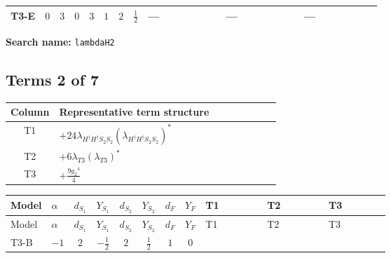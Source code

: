 \documentclass[8pt]{article}
\begin{document}
\begin{landscape}
\begin{longtable}{@{}llcccccc >{\raggedright\arraybackslash}p{0.21\linewidth} >{\raggedright\arraybackslash}p{0.21\linewidth} >{\raggedright\arraybackslash}p{0.21\linewidth}@{}}
\midrule
T3-E & $0$ & $3$ & $0$ & $3$ & $1$ & $2$ & $\frac{1}{2}$ & --- & --- & --- \\
\midrule
\bottomrule
\end{longtable}
\clearpage
\noindent\textbf{Search name: }\texttt{lambdaH2}\par\smallskip
\subsection*{Terms 2 of 7}
\begin{center}
\begin{tabular}{@{}c >{\raggedright\arraybackslash}p{0.82\linewidth}@{}}
\toprule
Column & Representative term structure \\
\midrule
T1 & \(\displaystyle +24 {\lambda_{H^\dagger H^\dagger S_2 S_2}} \left({\lambda_{H^\dagger H^\dagger S_2 S_2}}\right)^{*}\) \\
\midrule
T2 & \(\displaystyle +6 {\lambda_{T3}} \left({\lambda_{T3}}\right)^{*}\) \\
\midrule
T3 & \(\displaystyle +\frac{9 {g_2}^4}{4}\) \\
\midrule
\bottomrule
\end{tabular}
\end{center}
\smallskip
\tiny
\begin{longtable}{@{}llcccccc >{\raggedright\arraybackslash}p{0.21\linewidth} >{\raggedright\arraybackslash}p{0.21\linewidth} >{\raggedright\arraybackslash}p{0.21\linewidth}@{}}
\toprule
Model & $\alpha$ & $d_{S_1}$ & $Y_{S_1}$ & $d_{S_2}$ & $Y_{S_2}$ & $d_F$ & $Y_F$ & T1 & T2 & T3 \\
\midrule
\endfirsthead
\toprule
Model & $\alpha$ & $d_{S_1}$ & $Y_{S_1}$ & $d_{S_2}$ & $Y_{S_2}$ & $d_F$ & $Y_F$ & T1 & T2 & T3 \\
\midrule
\endhead
T3-B & $-1$ & $2$ & $-\frac{1}{2}$ & $2$ & $\frac{1}{2}$ & $1$ & $0$ & \scriptsize\adjustbox{max width=\linewidth}{$\begin{gathered} +24 {\lambda_{H^\dagger H^\dagger S_2 S_2}} \left({\lambda_{H^\dagger H^\dagger S_2 S_2}}\right)^{*}\end{gathered}$} & \scriptsize\adjustbox{max width=\linewidth}{$\begin{gathered} +6 {\lambda_{T3}} \left({\lambda_{T3}}\right)^{*}\end{gathered}$} & \scriptsize\adjustbox{max width=\linewidth}{$\begin{gathered} +\frac{9 {g_2}^4}{4}\end{gathered}$} \\

\end{longtable}
\end{landscape}
\end{document}
